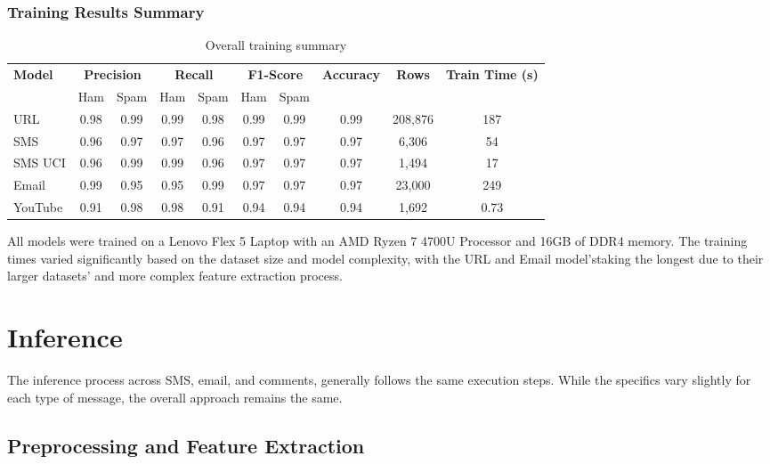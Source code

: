 \documentclass{article}
\begin{document}
\subsubsection{Training Results Summary}

\begin{table}[htbp]
    \centering
    \caption{Overall training summary}
    \label{tab:training_summary}
    \begin{tabular}{l cccccc c c c}
    \toprule
    \textbf{Model} & \multicolumn{2}{c}{\textbf{Precision}} & \multicolumn{2}{c}{\textbf{Recall}} & \multicolumn{2}{c}{\textbf{F1-Score}} & \textbf{Accuracy} & \textbf{Rows} & \textbf{Train Time (s)} \\
    \cmidrule(lr){2-3} \cmidrule(lr){4-5} \cmidrule(lr){6-7}
    & Ham & Spam & Ham & Spam & Ham & Spam & & & \\
    \midrule
    URL & 0.98 & 0.99 & 0.99 & 0.98 & 0.99 & 0.99 & 0.99 & 208,876 & 187 \\
    SMS & 0.96 & 0.97 & 0.97 & 0.96 & 0.97 & 0.97 & 0.97 & 6,306 & 54 \\
    SMS UCI & 0.96 & 0.99 & 0.99 & 0.96 & 0.97 & 0.97 & 0.97 & 1,494 & 17 \\
    Email & 0.99 & 0.95 & 0.95 & 0.99 & 0.97 & 0.97 & 0.97 & 23,000 & 249 \\
    YouTube & 0.91 & 0.98 & 0.98 & 0.91 & 0.94 & 0.94 & 0.94 & 1,692 & 0.73 \\
    \bottomrule
    \end{tabular}
\end{table}

\noindent
All models were trained on a Lenovo Flex 5 Laptop with an AMD Ryzen 7 4700U Processor and 16GB of DDR4 memory. The training times varied significantly based on the dataset size and model complexity, with the URL and Email model'staking the longest due to their larger datasets' and more complex feature extraction process.


\section{Inference}

The inference process across SMS, email, and comments, generally follows the same execution steps. While the specifics vary slightly for each type of message, the overall approach remains the same.


\subsection{Preprocessing and Feature Extraction}
\end{document}
